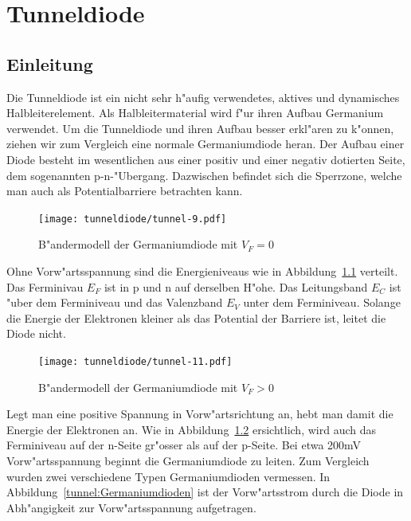 
\chapter{Tunneldiode\label{chapter:tunneldiode}}
\begin{refsection}

\section{Einleitung}

Die Tunneldiode ist ein nicht sehr h"aufig verwendetes, aktives und dynamisches Halbleiterelement.
Als Halbleitermaterial wird f"ur ihren  Aufbau Germanium verwendet. 
Um die Tunneldiode und ihren Aufbau besser erkl"aren zu k"onnen, ziehen wir zum Vergleich eine normale Germaniumdiode heran. 
Der Aufbau einer Diode besteht im wesentlichen aus einer positiv und einer negativ dotierten Seite, dem sogenannten p-n-"Ubergang. 
Dazwischen befindet sich die Sperrzone, welche man auch als Potentialbarriere betrachten kann.

\begin{figure}	%
\centering
\texttt{[image: tunneldiode/tunnel-9.pdf]}
\caption{B"andermodell der Germaniumdiode mit $V_F = 0$
\label{tunnel:BaendermodellG0}}
\end{figure}

Ohne Vorw"artsspannung sind die Energieniveaus wie in Abbildung~\ref{tunnel:BaendermodellG0} verteilt. Das Ferminivau $E_F$ ist in p und n auf derselben H"ohe. Das Leitungsband $E_C$ ist "uber dem Ferminiveau  und das Valenzband $E_V$ unter dem Ferminiveau. Solange die Energie der Elektronen kleiner als das Potential der Barriere ist, leitet die Diode nicht. 

\begin{figure}	%
\centering
\texttt{[image: tunneldiode/tunnel-11.pdf]}
\caption{B"andermodell der Germaniumdiode mit $V_F > 0$
\label{tunnel:BaendermodellG}}
\end{figure}

Legt man eine positive Spannung in Vorw"artsrichtung an, hebt man damit die Energie der Elektronen an. 
Wie in Abbildung~\ref{tunnel:BaendermodellG} ersichtlich, wird auch das Ferminiveau auf der n-Seite gr"osser als auf der p-Seite. 
Bei etwa 200mV Vorw"artsspannung beginnt die Germaniumdiode zu leiten. 
Zum Vergleich wurden zwei verschiedene Typen Germaniumdioden vermessen. 
In Abbildung~\ref{tunnel:Germaniumdioden} ist der Vorw"artsstrom durch die Diode in Abh"angigkeit zur Vorw"artsspannung aufgetragen.


\end{refsection}

